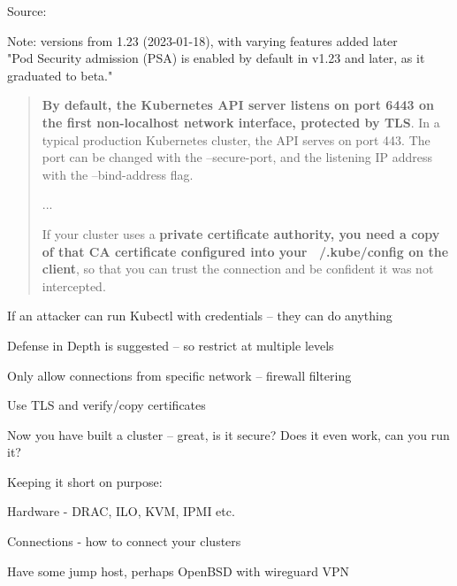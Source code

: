\documentclass[Screen16to9,17pt]{foils}
\begin{document}

Source: 

\begin{list2}
\item Note: versions from 1.23 (2023-01-18), with varying features added later\\
"Pod Security admission (PSA) is enabled by default in v1.23 and later, as it graduated to beta."
\end{list2}



\begin{quote}{\bf
By default, the Kubernetes API server listens on port 6443 on the first non-localhost network interface, protected by TLS}. In a typical production Kubernetes cluster, the API serves on port 443. The port can be changed with the --secure-port, and the listening IP address with the --bind-address flag.

...

If your cluster uses a {\bf private certificate authority, you need a copy of that CA certificate configured into your ~/.kube/config on the client}, so that you can trust the connection and be confident it was not intercepted.
\end{quote}

\begin{list2}
\item If an attacker can run Kubectl with credentials -- they can do anything
\item Defense in Depth is suggested -- so restrict at multiple levels
\item Only allow connections from specific network -- firewall filtering
\item Use TLS and verify/copy certificates
\end{list2}


Now you have built a cluster -- great, is it secure? Does it even work, can you run it?

Keeping it short on purpose:
\begin{list2}
\item Hardware - DRAC, ILO, KVM, IPMI etc.
\item Connections - how to connect your clusters
\item Have some jump host, perhaps OpenBSD with wireguard VPN
\end{list2}
\end{document}
